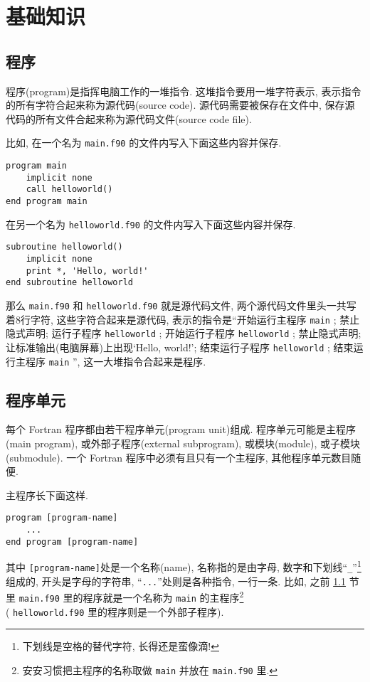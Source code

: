 \chapter{基础知识}

\section{程序}\label{fortran_program}

程序(program)是指挥电脑工作的一堆指令. 这堆指令要用一堆字符表示, 表示指令的所有字符合起来称为源代码(source code). 源代码需要被保存在文件中, 保存源代码的所有文件合起来称为源代码文件(source code file).

比如, 在一个名为 \texttt{main.f90} 的文件内写入下面这些内容并保存.
\begin{lstlisting}
program main
    implicit none
    call helloworld()
end program main
\end{lstlisting}
在另一个名为 \texttt{helloworld.f90} 的文件内写入下面这些内容并保存.
\begin{lstlisting}
subroutine helloworld()
    implicit none
    print *, 'Hello, world!'
end subroutine helloworld
\end{lstlisting}
那么 \texttt{main.f90} 和 \texttt{helloworld.f90} 就是源代码文件, 两个源代码文件里头一共写着8行字符, 这些字符合起来是源代码, 表示的指令是``开始运行主程序 \texttt{main} ; 禁止隐式声明; 运行子程序 \texttt{helloworld} ; 开始运行子程序 \texttt{helloworld} ; 禁止隐式声明; 让标准输出(电脑屏幕)上出现`Hello, world!'; 结束运行子程序 \texttt{helloworld} ; 结束运行主程序 \texttt{main} '', 这一大堆指令合起来是程序.

\section{程序单元}\label{program_unit}

每个 Fortran 程序都由若干程序单元(program unit)组成. 程序单元可能是主程序(main program), 或外部子程序(external subprogram), 或模块(module), 或子模块(submodule). 一个 Fortran 程序中必须有且只有一个主程序, 其他程序单元数目随便.

主程序长下面这样.
\begin{lstlisting}
program [program-name]
    ...
end program [program-name]
\end{lstlisting}
其中 \texttt{[program-name]}处是一个名称(name), 名称指的是由字母, 数字和下划线``\texttt{\_{}}''\footnote{
    下划线是空格的替代字符, 长得还是蛮像滴!
}组成的, 开头是字母的字符串, ``\texttt{...}''处则是各种指令, 一行一条. 比如, 之前 \ref{fortran_program} 节里 \texttt{main.f90} 里的程序就是一个名称为 \texttt{main} 的主程序\footnote{安安习惯把主程序的名称取做 \texttt{main} 并放在 \texttt{main.f90} 里.} \\( \texttt{helloworld.f90} 里的程序则是一个外部子程序).

